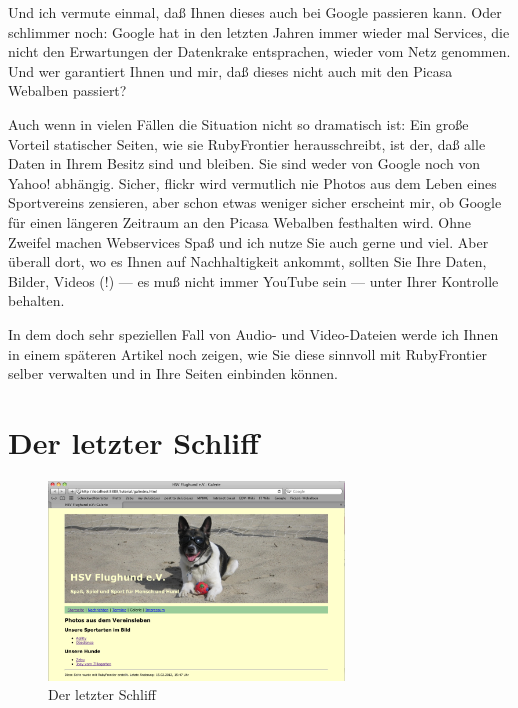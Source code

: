 \documentclass[11pt]{report}
\begin{document}
Und ich vermute einmal, daß Ihnen dieses auch bei Google passieren
kann. Oder schlimmer noch: Google hat in den letzten Jahren immer
wieder mal Services, die nicht den Erwartungen der Datenkrake
entsprachen, wieder vom Netz genommen. Und wer garantiert Ihnen und
mir, daß dieses nicht auch mit den Picasa Webalben passiert?


Auch wenn in vielen Fällen die Situation nicht so dramatisch ist: Ein
große Vorteil statischer Seiten, wie sie RubyFrontier herausschreibt,
ist der, daß alle Daten in Ihrem Besitz sind und bleiben. Sie sind
weder von Google noch von Yahoo! abhängig. Sicher, flickr wird
vermutlich nie Photos aus dem Leben eines Sportvereins zensieren, aber
schon etwas weniger sicher erscheint mir, ob Google für einen längeren
Zeitraum an den Picasa Webalben festhalten wird. Ohne Zweifel machen
Webservices Spaß und ich nutze Sie auch gerne und viel. Aber überall
dort, wo es Ihnen auf Nachhaltigkeit ankommt, sollten Sie Ihre Daten,
Bilder, Videos (!) — es muß nicht immer YouTube sein — unter Ihrer
Kontrolle behalten.


In dem doch sehr speziellen Fall von Audio- und Video-Dateien werde
ich Ihnen in einem späteren Artikel noch zeigen, wie Sie diese
sinnvoll mit RubyFrontier selber verwalten und in Ihre Seiten
einbinden können.
\section{Der letzter Schliff}
\label{sec-2-4-2}


\begin{figure}[h!]
\centering
\includegraphics[width=0.7\textwidth]{./images/galerie09.png}
\caption{\label{galerie09}Der letzter Schliff}
\end{figure}
\end{document}
